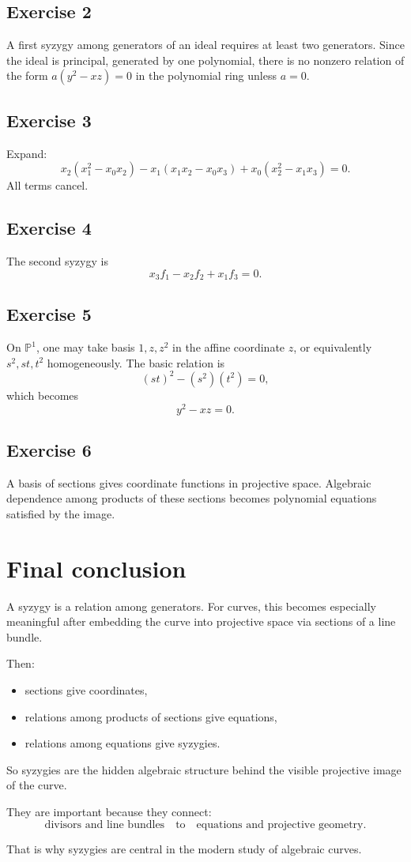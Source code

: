 \documentclass[11pt]{article}
\theoremstyle{definition}
\theoremstyle{remark}
\newcommand{\PP}{\mathbb{P}}
\begin{document}
	\subsection*{Exercise 2}
	A first syzygy among generators of an ideal requires at least two generators. Since the ideal is principal, generated by one polynomial, there is no nonzero relation of the form \(a(y^2-xz)=0\) in the polynomial ring unless \(a=0\).
	
	\subsection*{Exercise 3}
	Expand:
	\[
	x_2(x_1^2-x_0x_2)-x_1(x_1x_2-x_0x_3)+x_0(x_2^2-x_1x_3)=0.
	\]
	All terms cancel.
	
	\subsection*{Exercise 4}
	The second syzygy is
	\[
	x_3f_1-x_2f_2+x_1f_3=0.
	\]
	
	\subsection*{Exercise 5}
	On \(\PP^1\), one may take basis \(1,z,z^2\) in the affine coordinate \(z\), or equivalently \(s^2,st,t^2\) homogeneously. The basic relation is
	\[
	(st)^2-(s^2)(t^2)=0,
	\]
	which becomes
	\[
	y^2-xz=0.
	\]
	
	\subsection*{Exercise 6}
	A basis of sections gives coordinate functions in projective space. Algebraic dependence among products of these sections becomes polynomial equations satisfied by the image.
	
	\section{Final conclusion}
	
	A syzygy is a relation among generators. For curves, this becomes especially meaningful after embedding the curve into projective space via sections of a line bundle.
	
	Then:
	
	\begin{itemize}[leftmargin=2em]
		\item sections give coordinates,
		\item relations among products of sections give equations,
		\item relations among equations give syzygies.
	\end{itemize}
	
	So syzygies are the hidden algebraic structure behind the visible projective image of the curve.
	
	They are important because they connect:
	\[
	\text{divisors and line bundles}
	\quad\text{to}\quad
	\text{equations and projective geometry}.
	\]
	
	That is why syzygies are central in the modern study of algebraic curves.
	
\end{document}
